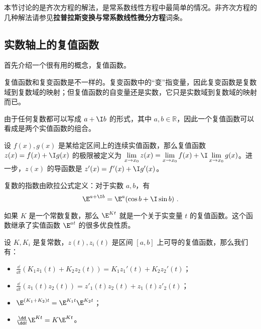 

本节讨论的是齐次方程的解法，是常系数线性方程中最简单的情况。非齐次方程的几种解法请参见\textbf{拉普拉斯变换与常系数线性微分方程}词条。


\subsection{实数轴上的复值函数}

首先介绍一个很有用的概念，复值函数。

复值函数和复变函数是不一样的。复变函数中的“变”指变量，因此复变函数是复数域到复数域的映射；但复值函数的自变量还是实数，它只是实数域到复数域的映射而已。

由于任何复数都可以写成 $a+\I b$ 的形式，其中 $a, b\in\mathbb{R}$，因此一个复值函数可以看成是两个实值函数的组合。

设 $f(x), g(x)$ 是某给定区间上的连续实值函数，那么复值函数 $z(x)=f(x)+\I g(x)$ 的极限被定义为 $\lim\limits_{x\to x_0}z(x)=\lim\limits_{x\to x_0}f(x)+\I\lim\limits_{x\to x_0}g(x)$。进一步，$z(x)$ 的导函数是 $z'(x)=f'(x)+\I g'(x)$。

复数的指数由欧拉公式定义：对于实数 $a, b$，有
\begin{equation}
\E^{a+\I b}=\E^a(\cos b+\I\sin b)~.
\end{equation}

如果 $K$ 是一个常数复数，那么 $\E^{Kt}$ 就是一个关于实变量 $t$ 的复值函数。这个函数继承了实值函数 $\E^{at}$ 的很多优良性质。

\begin{theorem}{}
设 $K, K_i$ 是复常数，$z(t), z_i(t)$ 是区间 $[a, b]$ 上可导的复值函数，那么我们有：
\begin{itemize}
\item $\frac{\dd }{\dd t}(K_1z_1(t)+K_2z_2(t))=K_1z_1'(t)+K_2z_2'(t)$；
\item $\frac{\dd}{\dd t}(z_1(t)z_2(t))=z'_1(t)z_2(t)+z_1(t)z'_2(t)$；
\item $\E^{(K_1+K_2)t}=\E^{K_1t}\E^{K_2t}$；
\item $\frac{\dd }{\dd t}\E^{Kt}=K\E^{Kt}$。
\end{itemize}
\end{theorem}

